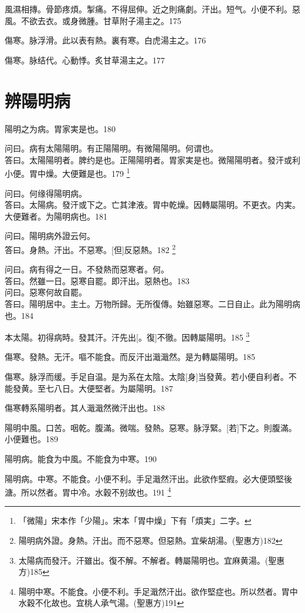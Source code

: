 \documentclass[oneside,b4paper]{ctexbook}
\begin{document}
\begin{flushleft}
風濕相摶。骨節疼煩。掣痛。不得屈伸。近之則痛劇。汗出。短气。小便不利。惡風。不欲去衣。或身微腫。甘草附子湯主之。175

傷寒。脉浮滑。此以表有熱。裏有寒。白虎湯主之。176

傷寒。脉结代。心動悸。炙甘草湯主之。177

\chapter{辨陽明病}

陽明之为病。胃家実是也。180

问曰。病有太陽陽明。有正陽陽明。有微陽陽明。何谓也。\\
答曰。太陽陽明者。脾约是也。正陽陽明者。胃家実是也。微陽陽明者。發汗或利小便。胃中燥。大便難是也。179
\footnote{「微陽」宋本作「少陽」。宋本「胃中燥」下有「煩実」二字。}

问曰。何缘得陽明病。\\
答曰。太陽病。發汗或下之。亡其津液。胃中乾燥。因轉屬陽明。不更衣。内実。大便難者。为陽明病也。181

问曰。陽明病外證云何。\\
答曰。身熱。汗出。不惡寒。[但]反惡熱。182
\footnote{陽明病外證。身熱。汗出。而不惡寒。但惡熱。宜柴胡湯。(聖惠方)182}

问曰。病有得之一日。不發熱而惡寒者。何。\\
答曰。然雖一日。惡寒自罷。即汗出。惡熱也。183\\
问曰。惡寒何故自罷。\\
答曰。陽明居中。主土。万物所歸。无所復傳。始雖惡寒。二日自止。此为陽明病也。184

本太陽。初得病時。發其汗。汗先出[。復]不徹。因轉屬陽明。185
\footnote{太陽病而發汗。汗雖出。復不解。不解者。轉屬陽明也。宜麻黄湯。(聖惠方)185}

傷寒。發熱。无汗。嘔不能食。而反汗出濈濈然。是为轉屬陽明。185

傷寒。脉浮而缓。手足自温。是为系在太陰。太陰[身]当發黄。若小便自利者。不能發黄。至七八日。大便堅者。为屬陽明。187

傷寒轉系陽明者。其人濈濈然微汗出也。188

陽明中風。口苦。咽乾。腹滿。微喘。發熱。惡寒。脉浮緊。[若]下之。則腹滿。小便難也。189

陽明病。能食为中風。不能食为中寒。190

陽明病。中寒。不能食。小便不利。手足濈然汗出。此欲作堅瘕。必大便頭堅後溏。所以然者。胃中冷。水穀不别故也。191
\footnote{陽明中寒。不能食。小便不利。手足濈然汗出。欲作堅症也。所以然者。胃中水穀不化故也。宜桃人承气湯。(聖惠方)191}


\end{flushleft}
\end{document}
